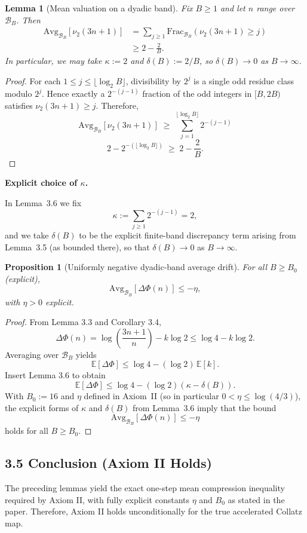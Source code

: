 \documentclass[preprint,12pt]{elsarticle}
\newtheorem{lemma}{Lemma}
\newtheorem{proposition}{Proposition}
\newcommand{\BandFrac}[2]{\mathrm{Frac}_{#1}\!\left(#2\right)} %
\newcommand{\BandAvg}[2]{\mathrm{Avg}_{#1}\!\left[#2\right]}  %
\begin{document}
\begin{lemma}[Mean valuation on a dyadic band]
Fix \(B\ge 1\) and let \(n\) range over \(\mathcal{B}_B\). Then
\[
\begin{aligned}
\BandAvg{\mathcal{B}_B}{\nu_2(3n+1)}
&= \sum_{j\ge 1}\BandFrac{\mathcal{B}_B}{\nu_2(3n+1)\ge j}\\
&\ge 2 - \frac{2}{B}.
\end{aligned}
\]
In particular, we may take \(\kappa := 2\) and \(\delta(B):=2/B\), so \(\delta(B)\to 0\) as \(B\to\infty\).
\end{lemma}

\begin{proof}
For each \(1\le j\le \lfloor \log_2 B \rfloor\), divisibility by \(2^j\)
is a single odd residue class modulo \(2^j\).
Hence exactly a \(2^{-(j-1)}\) fraction of the odd integers in \([B,2B)\)
satisfies \(\nu_2(3n+1)\ge j\).
Therefore,
\[
\BandAvg{\mathcal{B}_B}{\nu_2(3n+1)}
\;\ge\;\sum_{j=1}^{\lfloor \log_2 B \rfloor} 2^{-(j-1)}
\]
\[
2-2^{-(\lfloor \log_2 B \rfloor)}
\;\ge\;2-\frac{2}{B}.
\]
\end{proof}

\noindent\textbf{Explicit choice of $\kappa$.}\par
In Lemma~3.6 we fix
\[
\kappa := \sum_{j\ge 1}2^{-(j-1)} = 2,
\]
and we take $\delta(B)$ to be the explicit finite-band discrepancy term arising from Lemma~3.5
(as bounded there), so that $\delta(B)\to 0$ as $B\to\infty$.


\begin{proposition}[Uniformly negative dyadic-band average drift]
For all \(B\ge B_0\) (explicit),
\[
\BandAvg{\mathcal{B}_B}{\Delta\Phi(n)} \le -\eta,
\]
with \(\eta>0\) explicit.
\end{proposition}
\begin{proof}
From Lemma 3.3 and Corollary 3.4,
\[
\Delta\Phi(n)
= \log\!\left(\frac{3n+1}{n}\right) - k\log 2
\le \log 4 - k\log 2.
\]
Averaging over \(\mathcal{B}_B\) yields
\[
\mathbb{E}[\Delta\Phi]
\le \log 4 - (\log 2)\,\mathbb{E}[k].
\]
Insert Lemma 3.6 to obtain
\[
\mathbb{E}[\Delta\Phi]
\le \log 4 - (\log 2)(\kappa - \delta(B)).
\]
With $B_0:=16$ and $\eta$ defined in Axiom~II (so in particular $0<\eta\le \log(4/3)$), the explicit forms of $\kappa$ and $\delta(B)$ from
Lemma~3.6 imply that the bound
\[
\BandAvg{\mathcal{B}_B}{\Delta\Phi(n)}\le -\eta
\]
holds for all $B\ge B_0$.
\end{proof}

\subsection*{3.5 Conclusion (Axiom II Holds)}
\label{sec:axiomII_conclusion}
The preceding lemmas yield the exact one-step mean compression inequality required by Axiom II, with fully explicit constants \(\eta\) and \(B_0\) as stated in the paper.
Therefore, Axiom II holds unconditionally for the true accelerated Collatz map.
\end{document}
